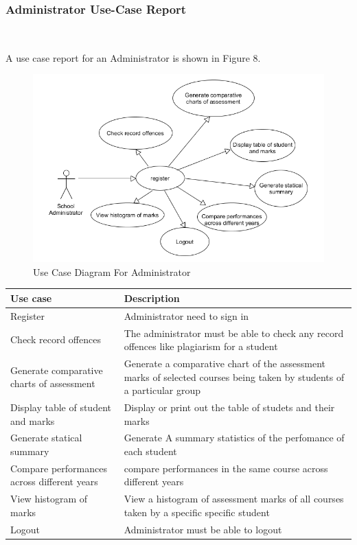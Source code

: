 	
	
	
	\clearpage
	\subsubsection{Administrator Use-Case Report}$\;\;\;\;\;\;\;\;\;\;\;\;\;\;\;\;\;\;\;\;\;\;\;$
	
	A use case report for an Administrator is shown in Figure 8.
	\begin{center}
		\begin{figure}[h]
			\centering
			\includegraphics[trim={0cm 0cm 0cm 0cm },clip,scale = 0.85]{AdminUsecase}
			\caption{Use Case Diagram For Administrator}
		\end{figure}
	\end{center}
	
	
	
	\begin{center}
		\begin{tabular}{ | p{3cm} | p{10cm}| }
			\hline
			\textbf{Use case}& \textbf{Description} \\ \hline
			Register & Administrator need to sign in \\ \hline
			Check record offences & The administrator must be able to check any record offences like plagiarism for a student   \\ \hline
			Generate comparative charts of assessment & Generate a comparative chart of the assessment marks of selected courses 
being taken by students of a particular group \\ \hline
Display table of student and marks & Display or print out the table
of studets and their marks\\ \hline
Generate statical summary & Generate A summary statistics of the perfomance of each student  \\ \hline
Compare performances across different years & compare performances in the same course across different years \\ \hline 
View histogram of marks & View a histogram of assessment marks
of all courses taken by a specific specific student  \\ \hline 

			Logout          & Administrator must be able to logout  \\ \hline
			
		\end{tabular}
	\end{center}
	
